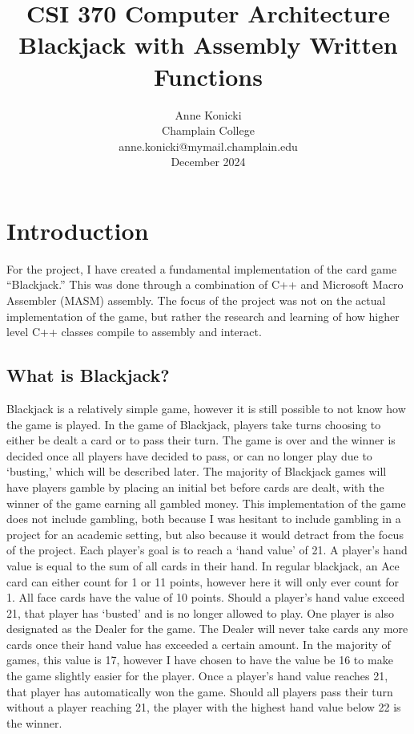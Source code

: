 \documentclass[twoside]{article}
\date{}
\begin{document}
    \title{CSI 370 Computer Architecture \\ Blackjack with Assembly Written Functions }
    \author{Anne Konicki \\ Champlain College \\ anne.konicki@mymail.champlain.edu \\ December 2024 }
    \maketitle


    \section{Introduction}\label{sec:introduction}
    For the project, I have created a fundamental implementation of the card game ``Blackjack.''
    This was done through a combination of C++ and Microsoft Macro Assembler (MASM) assembly.
    The focus of the project was not on the actual implementation of the game, but rather the research and learning of how higher level C++ classes compile to assembly and interact.

    \subsection{What is Blackjack?}\label{subsec:what-is-blackjack?}
    Blackjack is a relatively simple game, however it is still possible to not know how the game is played.
    In the game of Blackjack, players take turns choosing to either be dealt a card or to pass their turn.
    The game is over and the winner is decided once all players have decided to pass, or can no longer play due to `busting,' which will be described later.
    The majority of Blackjack games will have players gamble by placing an initial bet before cards are dealt, with the winner of the game earning all gambled money.
    This implementation of the game does not include gambling, both because I was hesitant to include gambling in a project for an academic setting, but also because it would detract from the focus of the project.
    \bigbreak
    \noindent
    Each player's goal is to reach a `hand value' of 21.
    A player's hand value is equal to the sum of all cards in their hand.
    In regular blackjack, an Ace card can either count for 1 or 11 points, however here it will only ever count for 1.
    All face cards have the value of 10 points.
    Should a player's hand value exceed 21, that player has `busted' and is no longer allowed to play.
    One player is also designated as the Dealer for the game.
    The Dealer will never take cards any more cards once their hand value has exceeded a certain amount.
    In the majority of games, this value is 17, however I have chosen to have the value be 16 to make the game slightly easier for the player.
    \bigbreak
    \noindent
    Once a player's hand value reaches 21, that player has automatically won the game.
    Should all players pass their turn without a player reaching 21, the player with the highest hand value below 22 is the winner.
\end{document}
